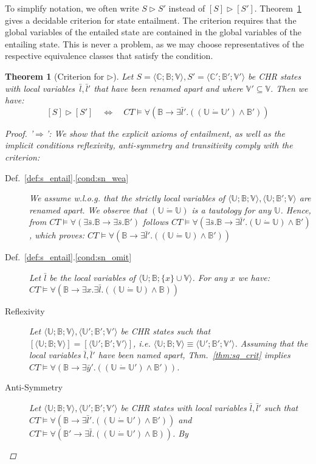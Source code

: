 \documentclass[acmtocl]{acmtrans2m}
\newtheorem{theorem}{Theorem}[section]
\newcommand{\de}{\dot=}
\newcommand\state[1]{\langle #1 \rangle}
\newcommand\ent{\rhd}
\newcommand{\B}{\ensuremath{\mathbb{B}}}
\newcommand{\U}{\ensuremath{\mathbb{U}}}
\newcommand{\C}{\ensuremath{\mathbb{C}}}
\newcommand{\V}{\ensuremath{\mathbb{V}}}
\newcommand{\by}{\bar{y}}
\newcommand{\bl}{\bar{l}}
\newcommand{\bs}{\bar{s}}
\begin{document}
To simplify notation, we often write $S\ent S'$ instead of $[S]\ent [S']$.
Theorem~\ref{thm:se_crit} gives a decidable criterion for state entailment. The
criterion requires that the global variables of the entailed state are contained
in the global variables of the entailing state. This is never a problem, as we
may choose representatives of the respective equivalence classes that satisfy the
condition.

\begin{theorem}[Criterion for $\ent$]\label{thm:se_crit} Let $S =
\state{\C;\B;\V}, S' = \state{\C';\B';\V'}$ be CHR states with local
variables~$\bl,\bl'$ that have been renamed apart and where $\V'\subseteq\V$.
Then we have:
\[ [S]\ent [S']
	\quad\Leftrightarrow\quad
	CT\models \forall (\B \rightarrow \exists \bl'.((\U \de \U') \wedge\B'))
\]
\begin{proof}
\noindent'$\Rightarrow$': We show that the explicit axioms of entailment, as well as the implicit conditions reflexivity,
anti-symmetry and transitivity comply with the criterion:
\begin{description}
	\item[Def.~\ref{def:s_entail}.\ref{cond:sn_wea}] We assume w.l.o.g. that the strictly local variables of $\state{\U;\B;\V},\state{\U;\B';\V}$ are renamed apart. We observe that
	$(\U\de\U)$ is
	a tautology for any $\U$. Hence, from $CT\models\forall(\exists\bs.\B\rightarrow\exists\bs.\B')$ follows
	$CT\models\forall(\exists\bs.\B\rightarrow\exists\bl'.(\U\de\U)\wedge\B')$, which proves:
	$
		CT\models \forall (\B\rightarrow\exists\bl'.((\U\de\U)\wedge\B'))
	$
	\item[Def.~\ref{def:s_entail}.\ref{cond:sn_omit}] Let $\bl$ be the
	local variables of $\state{\U;\B;\{x\}\cup\V}$. For any $x$ we have:
	$
		CT\models \forall (\B\rightarrow\exists
		x.\exists\bl.((\U\de\U)\wedge\B))
	$
	\item[Reflexivity] Let $\state{\U;\B;\V},\state{\U';\B';\V'}$ be CHR
states
	such that $[\state{\U;\B;\V}]=[\state{\U';\B';\V'}]$, i.e.
	$\state{\U;\B;\V}\equiv \state{\U';\B';\V'}$. Assuming that the local
	variables $\bl, \bl'$ have been named apart, Thm.~\ref{thm:sq_crit}
implies
	$
		CT\models \forall (\B\rightarrow\exists\by'.((\U\de\U')\wedge\B'))
	$.
	\item[Anti-Symmetry] Let $\state{\U;\B;\V},\state{\U';\B';\V'}$ be CHR
states
	with local variables $\bl,\bl'$ such that $CT\models \forall
	(\B\rightarrow\exists\bl'.((\U\de\U')\wedge\B'))$ and  $CT\models \forall
	(\B'\rightarrow\exists\bl.((\U\de\U')\wedge\B))$. By

\end{description}
\end{proof}
\end{theorem}
\end{document}
